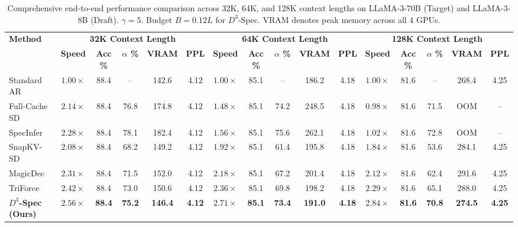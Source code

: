\documentclass[runningheads]{llncs}
\begin{document}
\begin{table}[t]
\centering
\caption{Comprehensive end-to-end performance comparison across 32K, 64K, and 128K context lengths on LLaMA-3-70B (Target) and LLaMA-3-8B (Draft). $\gamma = 5$. Budget $B = 0.12L$ for $D^3$-Spec. VRAM denotes peak memory across all 4 GPUs.}
\label{tab:main_results}
\small
\setlength{\tabcolsep}{4pt}
\begin{tabularx}{\textwidth}{l ccccc ccccc ccccc}
\toprule
\multirow{2}{*}{\textbf{Method}} & \multicolumn{5}{c}{\textbf{32K Context Length}} & \multicolumn{5}{c}{\textbf{64K Context Length}} & \multicolumn{5}{c}{\textbf{128K Context Length}} \\
\cmidrule(lr){2-6} \cmidrule(lr){7-11} \cmidrule(lr){12-16}
& \textbf{Speed} & \textbf{Acc \%} & \textbf{$\alpha$ \%} & \textbf{VRAM} & \textbf{PPL} & \textbf{Speed} & \textbf{Acc \%} & \textbf{$\alpha$ \%} & \textbf{VRAM} & \textbf{PPL} & \textbf{Speed} & \textbf{Acc \%} & \textbf{$\alpha$ \%} & \textbf{VRAM} & \textbf{PPL} \\
\midrule
Standard AR & $1.00\times$ & 88.4 & -- & 142.6 & 4.12 & $1.00\times$ & 85.1 & -- & 186.2 & 4.18 & $1.00\times$ & 81.6 & -- & 268.4 & 4.25 \\
Full-Cache SD & $2.14\times$ & 88.4 & 76.8 & 174.8 & 4.12 & $1.48\times$ & 85.1 & 74.2 & 248.5 & 4.18 & $0.98\times$ & 81.6 & 71.5 & OOM & -- \\
SpecInfer & $2.28\times$ & 88.4 & 78.1 & 182.4 & 4.12 & $1.56\times$ & 85.1 & 75.6 & 262.1 & 4.18 & $1.02\times$ & 81.6 & 72.8 & OOM & -- \\
SnapKV-SD & $2.08\times$ & 88.4 & 68.2 & 149.2 & 4.12 & $1.92\times$ & 85.1 & 61.4 & 195.8 & 4.18 & $1.84\times$ & 81.6 & 53.6 & 284.1 & 4.25 \\
MagicDec & $2.31\times$ & 88.4 & 71.5 & 152.0 & 4.12 & $2.18\times$ & 85.1 & 67.2 & 201.4 & 4.18 & $2.12\times$ & 81.6 & 62.4 & 291.6 & 4.25 \\
TriForce & $2.42\times$ & 88.4 & 73.0 & 150.6 & 4.12 & $2.36\times$ & 85.1 & 69.8 & 198.2 & 4.18 & $2.29\times$ & 81.6 & 65.1 & 288.0 & 4.25 \\
\midrule
\textbf{$D^3$-Spec (Ours)} & $\mathbf{2.56\times}$ & \textbf{88.4} & \textbf{75.2} & \textbf{146.4} & \textbf{4.12} & $\mathbf{2.71\times}$ & \textbf{85.1} & \textbf{73.4} & \textbf{191.0} & \textbf{4.18} & $\mathbf{2.84\times}$ & \textbf{81.6} & \textbf{70.8} & \textbf{274.5} & \textbf{4.25} \\
\bottomrule
\end{tabularx}
\end{table}
\end{document}
